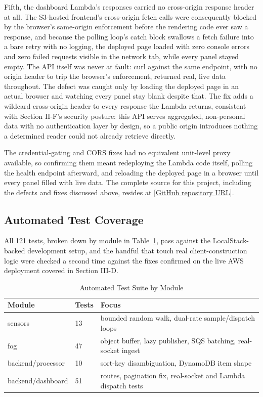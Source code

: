 \documentclass[conference]{IEEEtran}
\begin{document}
Fifth, the dashboard Lambda's responses carried no cross-origin response header at all. The S3-hosted frontend's cross-origin fetch calls were consequently blocked by the browser's same-origin enforcement before the rendering code ever saw a response, and because the polling loop's catch block swallows a fetch failure into a bare retry with no logging, the deployed page loaded with zero console errors and zero failed requests visible in the network tab, while every panel stayed empty. The API itself was never at fault: curl against the same endpoint, with no origin header to trip the browser's enforcement, returned real, live data throughout. The defect was caught only by loading the deployed page in an actual browser and watching every panel stay blank despite that. The fix adds a wildcard cross-origin header to every response the Lambda returns, consistent with Section II-F's security posture: this API serves aggregated, non-personal data with no authentication layer by design, so a public origin introduces nothing a determined reader could not already retrieve directly.

The credential-gating and CORS fixes had no equivalent unit-level proxy available, so confirming them meant redeploying the Lambda code itself, polling the health endpoint afterward, and reloading the deployed page in a browser until every panel filled with live data. The complete source for this project, including the defects and fixes discussed above, resides at \href{[GitHub repository URL]}{[GitHub repository URL]}.

\subsection{Automated Test Coverage}
All 121 tests, broken down by module in Table~\ref{tab:tests}, pass against the LocalStack-backed development setup, and the handful that touch real client-construction logic were checked a second time against the fixes confirmed on the live AWS deployment covered in Section III-D.

\begin{table}[!t]
\caption{Automated Test Suite by Module}
\label{tab:tests}
\centering
\footnotesize
\begin{tabular}{|p{}|p{}|p{}|}
\hline
\textbf{Module} & \textbf{Tests} & \textbf{Focus} \\
\hline
sensors & 13 & bounded random walk, dual-rate sample/dispatch loops \\
\hline
fog & 47 & object buffer, lazy publisher, SQS batching, real-socket ingest \\
\hline
backend/processor & 10 & sort-key disambiguation, DynamoDB item shape \\
\hline
backend/dashboard & 51 & routes, pagination fix, real-socket and Lambda dispatch tests \\
\hline
\end{tabular}
\end{table}
\end{document}
